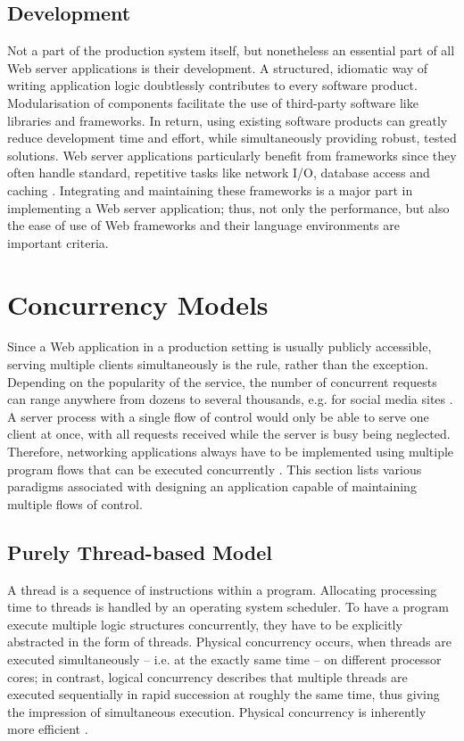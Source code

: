 \subsection{Development}
Not a part of the production system itself, but nonetheless an essential part of all Web server applications is their development. A structured, idiomatic way of writing application logic doubtlessly contributes to every software product. Modularisation of components facilitate the use of third-party software like libraries and frameworks. In return, using existing software products can greatly reduce development time and effort, while simultaneously providing robust, tested solutions. Web server applications particularly benefit from frameworks since they often handle standard, repetitive tasks like network I/O, database access and caching \cite[p. 1]{Reelsen2011}. Integrating and maintaining these frameworks is a major part in implementing a Web server application; thus, not only the performance, but also the ease of use of Web frameworks and their language environments are important criteria.


\section{Concurrency Models}
\label{sec:concurrency}

Since a Web application in a production setting is usually publicly accessible, serving multiple clients simultaneously is the rule, rather than the exception. Depending on the popularity of the service, the number of concurrent requests can range anywhere from dozens to several thousands, e.g. for social media sites \cite[p. 1]{Drolia2010}. A server process with a single flow of control would only be able to serve one client at once, with all requests received while the server is busy being neglected. Therefore, networking applications always have to be implemented using multiple program flows that can be executed concurrently \cite{Webopedia}. This section lists various paradigms associated with designing an application capable of maintaining multiple flows of control.

\subsection{Purely Thread-based Model}
\label{sec:threads}
A thread is a sequence of instructions within a program. Allocating processing time to threads is handled by an operating system scheduler. To have a program execute multiple logic structures concurrently, they have to be explicitly abstracted in the form of threads. Physical concurrency occurs, when threads are executed simultaneously -- i.e. at the exactly same time -- on different processor cores; in contrast, logical concurrency describes that multiple threads are executed sequentially in rapid succession at roughly the same time, thus giving the impression of simultaneous execution. Physical concurrency is inherently more efficient \cite{ThreadsJava}.

